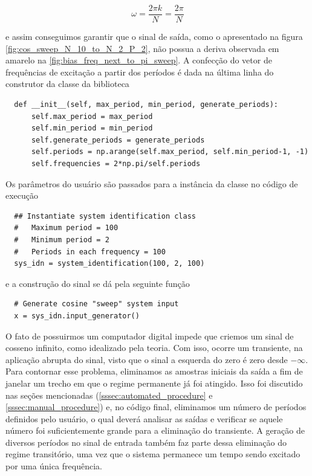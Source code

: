 \documentclass[x11names,a4paper,12pt]{article}
\begin{document}
\begin{equation}
  \omega=\frac{2\pi k}{N}=\frac{2\pi}{N}
\end{equation}

e assim conseguimos garantir que o sinal de saída, como o apresentado na figura \ref{fig:cos_sweep_N_10_to_N_2_P_2}, não possua a deriva observada em amarelo na \ref{fig:bias_freq_next_to_pi_sweep}. A confecção do vetor de frequências de excitação a partir dos períodos é dada na última linha do construtor da classe da biblioteca

\begin{verbatim}
  def __init__(self, max_period, min_period, generate_periods):
      self.max_period = max_period
      self.min_period = min_period
      self.generate_periods = generate_periods
      self.periods = np.arange(self.max_period, self.min_period-1, -1)
      self.frequencies = 2*np.pi/self.periods
\end{verbatim}

Os parâmetros do usuário são passados para a instância da classe no código de execução

\begin{verbatim}
  ## Instantiate system identification class
  #   Maximum period = 100
  #   Minimum period = 2
  #   Periods in each frequency = 100
  sys_idn = system_identification(100, 2, 100)
\end{verbatim}

e a construção do sinal se dá pela seguinte função

\begin{verbatim}
  # Generate cosine "sweep" system input
  x = sys_idn.input_generator()
\end{verbatim}

O fato de possuirmos um computador digital impede que criemos um sinal de cosseno infinito, como idealizado pela teoria. Com isso, ocorre um transiente, na aplicação abrupta do sinal, visto que o sinal a esquerda do zero é zero desde $-\infty$. Para contornar esse problema, eliminamos as amostras iniciais da saída a fim de janelar um trecho em que o regime permanente já foi atingido. Isso foi discutido nas seções mencionadas (\ref{sssec:automated_procedure} e \ref{sssec:manual_procedure}) e, no código final, eliminamos um número de períodos definidos pelo usuário, o qual deverá analisar as saídas e verificar se aquele número foi suficientemente grande para a eliminação do transiente. A geração de diversos períodos no sinal de entrada também faz parte dessa eliminação do regime transitório, uma vez que o sistema permanece um tempo sendo excitado por uma única frequência.
\end{document}
